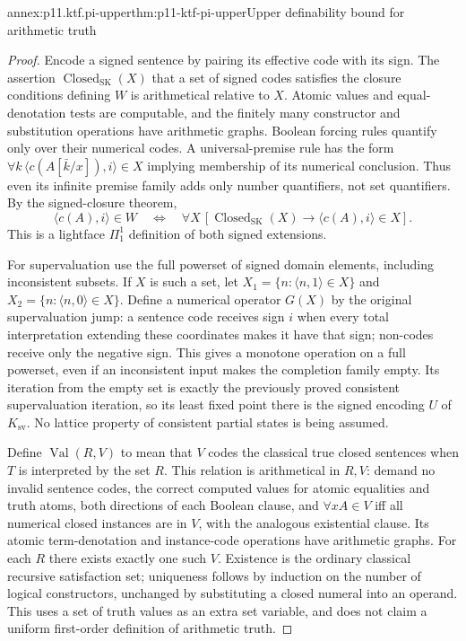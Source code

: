 \begin{annexitem}{annex:p11.ktf.pi-upper}{thm:p11-ktf-pi-upper}{Upper definability bound for arithmetic truth}
\begin{proof}
Encode a signed sentence by pairing its effective code with its sign.
The assertion \(\operatorname{Closed}_{\mathrm{SK}}(X)\) that a set
of signed codes satisfies the closure conditions defining \(W\) is
arithmetical relative to \(X\). Atomic values and equal-denotation
tests are computable, and the finitely many constructor and substitution
operations have arithmetic graphs. Boolean forcing rules quantify only
over their numerical codes. A universal-premise rule has the form
\(\forall k\,\langle c(A[\bar k/x]),i\rangle\in X\)
implying membership of its numerical conclusion. Thus even its infinite
premise family adds only number quantifiers, not set quantifiers.
By the signed-closure theorem,
\[
 \langle c(A),i\rangle\in W
 \quad\Longleftrightarrow\quad
 \forall X\,[\operatorname{Closed}_{\mathrm{SK}}(X)
                  \to\langle c(A),i\rangle\in X].
\]
This is a lightface \(\Pi^1_1\) definition of both signed extensions.

For supervaluation use the full powerset of signed domain elements,
including inconsistent subsets. If \(X\) is such a set, let
\(X_1=\{n:\langle n,1\rangle\in X\}\) and
\(X_2=\{n:\langle n,0\rangle\in X\}\). Define a numerical
operator \(G(X)\) by the original supervaluation jump: a sentence
code receives sign \(i\) when every total interpretation extending
these coordinates makes it have that sign; non-codes receive only
the negative sign. This gives a monotone operation on a full powerset,
even if an inconsistent input makes the completion family empty.
Its iteration from the empty set is exactly the previously proved
consistent supervaluation iteration, so its least fixed point there
is the signed encoding \(U\) of \(K_{\mathrm{sv}}\).
No lattice property of consistent partial states is being assumed.

Define \(\operatorname{Val}(R,V)\) to mean that \(V\) codes the
classical true closed sentences when \(T\) is interpreted by the
set \(R\). This relation is arithmetical in \(R,V\): demand no
invalid sentence codes, the correct computed values for atomic
equalities and truth atoms, both directions of each Boolean clause,
and \(\forall x A\in V\) iff all numerical closed instances are
in \(V\), with the analogous existential clause. Its atomic
term-denotation and instance-code operations have arithmetic graphs.
For each \(R\) there exists exactly one such \(V\). Existence
is the ordinary classical recursive satisfaction set; uniqueness
follows by induction on the number of logical constructors, unchanged
by substituting a closed numeral into an operand. This uses a set of
truth values as an extra set variable, and does not claim a uniform
first-order definition of arithmetic truth.


\end{proof}
\end{annexitem}
